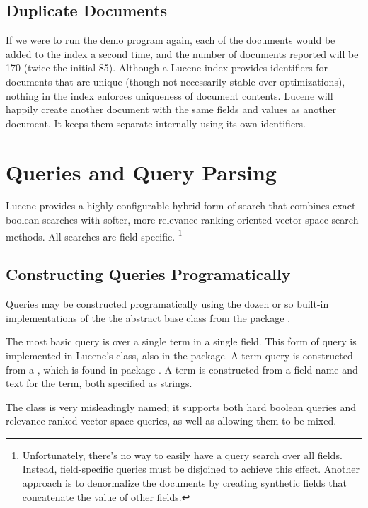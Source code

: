 \subsection{Duplicate Documents}

If we were to run the demo program again, each of the documents would
be added to the index a second time, and the number of documents
reported will be 170 (twice the initial 85).  Although a Lucene index
provides identifiers for documents that are unique (though not
necessarily stable over optimizations), nothing in the index enforces
uniqueness of document contents.  Lucene will happily create another
document with the same fields and values as another document.  It
keeps them separate internally using its own identifiers.


\section{Queries and Query Parsing}

Lucene provides a highly configurable hybrid form of search that
combines exact boolean searches with softer, more
relevance-ranking-oriented vector-space search methods.  All searches
are field-specific.
%
\footnote{Unfortunately, there's no way to easily have a query search
  over all fields.  Instead, field-specific queries must be disjoined
  to achieve this effect.  Another approach is to denormalize the
  documents by creating synthetic fields that concatenate the value of
  other fields.}

\subsection{Constructing Queries Programatically}

Queries may be constructed programatically using the dozen or so
built-in implementations of the the  abstract base class
from the package .  

The most basic query is over a single term in a single field.  This
form of query is implemented in Lucene's  class, also
in the  package.  A term query is constructed from a
, which is found in package .
A term is constructed from a field name and text for the term, both
specified as strings.

The  class is very misleadingly named; it
supports both hard boolean queries and relevance-ranked vector-space
queries, as well as allowing them to be mixed.

